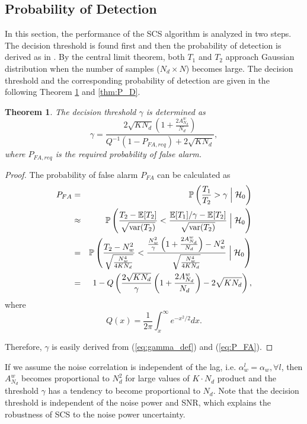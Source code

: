 \documentclass[draftclsnofoot,onecolumn,12pt]{IEEEtran}
\newtheorem{theorem}{Theorem}\newtheorem{lemma}{Lemma}
\begin{document}
\subsection{Probability of Detection}
\label{subsec:ProDet}

In this section, the performance of the SCS algorithm is analyzed in two steps. The decision threshold is found first and then the probability of detection is derived as in \cite{ZenLia09}. By the central limit theorem, both $T_1$ and $T_2$ approach Gaussian distribution when the number of samples ($N_d \times N$) becomes large.
The decision threshold and the corresponding probability of detection are given in the following Theorem \ref{thm:gamma} and \ref{thm:P_D}.


\begin{theorem}
  \label{thm:gamma}
  The decision threshold $\gamma$ is determined as
\begin{equation}
  \gamma = \frac{2\sqrt{KN_d} \left( 1 + \frac{2A_{N_d}^w}{N_d}\right)}{Q^{-1}(1 - P_{FA,req}) + 2\sqrt{KN_d}}, \label{eq:gamma}
\end{equation}
where $P_{FA,req}$ is the required probability of false alarm.
\end{theorem}

\begin{proof}
The probability of false alarm $P_{FA}$ can be calculated as \begin{eqnarray}
  P_{FA} &=& \mathbb{P} \left(\frac{T_1}{T_2} > \gamma \Bigm| \mathcal{H}_0 \right) \nonumber \\
&\approx& \mathbb{P} \left(\frac{T_2 - \mathbb{E}[T_2]}{\sqrt{\mathrm{var}(T_2)}} < \frac{\mathbb{E}[T_1] / \gamma - \mathbb{E}[T_2]}{\sqrt{\mathrm{var}(T_2)}}\Bigm| \mathcal{H}_0 \right)\nonumber \\
    &=& \mathbb{P} \left(\frac{T_2 - N_w^2}{\sqrt{\frac{N_w^4}{4KN_d}}} < \frac{\frac{N_w^2}{\gamma}\left(1 + \frac{2A_{N_d}^w}{N_d}\right) - N_w^2}{\sqrt{\frac{N_w^4}{4KN_d}}} \Bigm| \mathcal{H}_0 \right)\\
    &=& 1 - Q\left( \frac{2\sqrt{KN_d}}{\gamma}\left(1 + \frac{2A_{N_d}^w}{N_d}\right) - 2\sqrt{KN_d} \right) \label{eq:P_FA},
\end{eqnarray}
where \[Q(x) = \frac{1}{2\pi} \int_x^\infty e^{-x^2/2} dx.\]

Therefore, $\gamma$ is easily derived from (\ref{eq:gamma_def}) and (\ref{eq:P_FA}).
\end{proof}


If we assume the noise correlation is independent of the lag, i.e. $\alpha_w^l = \alpha_w, \forall l$, then $A_{N_d}^w$ becomes proportional to $N_d^2$ for large values of $K \cdot N_d$ product and the threshold $\gamma$ has a tendency to become proportional to $N_d$. Note that the decision threshold is independent of the noise power and SNR, which explains the robustness of SCS to the noise power uncertainty.
\end{document}
